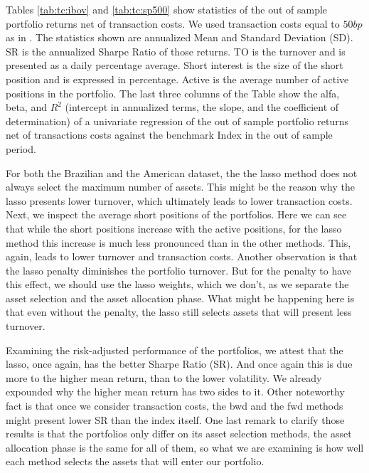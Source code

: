 \documentclass[12pt,oneside,a4paper]{memoir}
\begin{document}
Tables \ref{tab:tc:ibov} and \ref{tab:tc:sp500} show statistics of the out of sample portfolio returns net of transaction costs.
We used transaction costs equal to $50bp$ as in .
The statistics shown are annualized Mean and Standard Deviation (SD).
SR is the annualized Sharpe Ratio of those returns.
TO is the turnover and is presented as a daily percentage average.
Short interest is the size of the short position and is expressed in percentage.
Active is the average number of active positions in the portfolio.
The last three columns of the Table show the alfa, beta, and $R^2$ (intercept in annualized terms, the slope, and the coefficient of determination) of a univariate regression of the out of sample portfolio returns net of transactions costs against the benchmark Index in the out of sample period.

For both the Brazilian and the American dataset, the the lasso method does not always select the maximum number of assets.
This might be the reason why the lasso presents lower turnover, which ultimately leads to lower transaction costs.
Next, we inspect the average short positions of the portfolios.
Here we can see that while the short positions increase with the active positions, for the lasso method this increase is much less pronounced than in the other methods.
This, again, leads to lower turnover and transaction costs.
Another observation is that the lasso penalty diminishes the portfolio turnover.
But for the penalty to have this effect, we should use the lasso weights, which we don't, as we separate the asset selection and the asset allocation phase.
What might be happening here is that even without the penalty, the lasso still selects assets that will present less turnover.

Examining the risk-adjusted performance of the portfolios, we attest that the lasso, once again, has the better Sharpe Ratio (SR).
And once again this is due more to the higher mean return, than to the lower volatility.
We already expounded why the higher mean return has two sides to it.
Other noteworthy fact is that once we consider transaction costs, the bwd and the fwd methods might present lower SR than the index itself.
One last remark to clarify those results is that the portfolios only differ on its asset selection methods, the asset allocation phase is the same for all of them, so what we are examining is how well each method selects the assets that will enter our portfolio.
\end{document}
